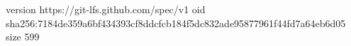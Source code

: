 version https://git-lfs.github.com/spec/v1
oid sha256:7184de359a6bf434393cf8ddcfcb184f5dc832ade95877961f44fd7a64eb6d05
size 599
